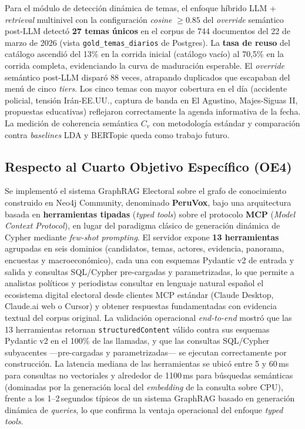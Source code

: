 Para el módulo de detección dinámica de temas, el enfoque híbrido LLM +
\textit{retrieval} multinivel con la configuración \textit{cosine} $\geq 0.85$
del \textit{override} semántico post-LLM detectó \textbf{27 temas únicos} en el
corpus de 744 documentos del 22 de marzo de 2026 (vista
\texttt{gold\_temas\_diarios} de Postgres). La \textbf{tasa de reuso} del catálogo
ascendió del 13\% en la corrida inicial (catálogo vacío) al 70{,}5\% en la
corrida completa, evidenciando la curva de maduración esperable. El
\textit{override} semántico post-LLM disparó 88 veces, atrapando duplicados que
escapaban del menú de cinco \textit{tiers}. Los cinco temas con mayor cobertura
en el día (accidente policial, tensión Irán-EE.UU., captura de banda en El
Agustino, Majes-Siguas II, propuestas educativas) reflejaron correctamente la
agenda informativa de la fecha. La medición de coherencia semántica $C_v$ con
metodología estándar y comparación contra \textit{baselines} LDA y BERTopic
queda como trabajo futuro.
\subsection*{Respecto al Cuarto Objetivo Específico (OE4)}
Se implementó el sistema GraphRAG Electoral sobre el grafo de conocimiento
construido en Neo4j Community, denominado \textbf{PeruVox}, bajo una arquitectura
basada en \textbf{herramientas tipadas} (\textit{typed tools}) sobre el protocolo
\textbf{MCP} (\textit{Model Context Protocol}), en lugar del paradigma clásico de
generación dinámica de Cypher mediante \textit{few-shot prompting}. El servidor
expone \textbf{13 herramientas} agrupadas en seis dominios (candidatos, temas,
actores, evidencia, panorama, encuestas y macroeconómico), cada una con esquemas
Pydantic v2 de entrada y salida y consultas SQL/Cypher pre-cargadas y
parametrizadas, lo que permite a analistas políticos y periodistas consultar en
lenguaje natural español el ecosistema digital electoral desde clientes MCP
estándar (Claude Desktop, Claude.ai web o Cursor) y obtener respuestas
fundamentadas con evidencia textual del corpus original. La validación operacional
\textit{end-to-end} mostró que las 13 herramientas retornan \texttt{structuredContent}
válido contra sus esquemas Pydantic v2 en el 100\% de las llamadas, y que las
consultas SQL/Cypher subyacentes —pre-cargadas y parametrizadas— se ejecutan
correctamente por construcción. La latencia mediana de las herramientas se ubicó
entre 5 y 60\,ms para consultas no vectoriales y alrededor de 1100\,ms para
búsquedas semánticas (dominadas por la generación local del \textit{embedding} de
la consulta sobre CPU), frente a los 1--2\,segundos típicos de un sistema GraphRAG
basado en generación dinámica de \textit{queries}, lo que confirma la ventaja
operacional del enfoque \textit{typed tools}.

